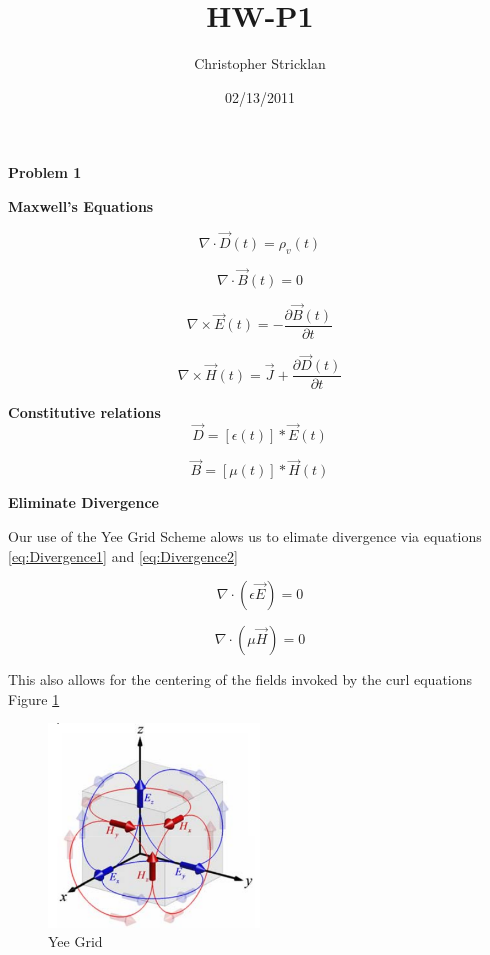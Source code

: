 \documentclass[a4paper,10pt]{article}
\title{HW\pound3-P1}
\author{Christopher Stricklan}
\date{02/13/2011}
\begin{document}
\textbf{Problem 1}


\textbf{Maxwell's Equations}  

\begin{equation}
  \nabla \cdot \vec{D}(t)=\rho_{v}(t)
\end{equation}

\begin{equation}
  \nabla \cdot \vec{B}(t)=0
\end{equation}

\begin{equation}
  \nabla \times \vec{E}(t) = -\frac{\partial \vec{B}(t)}{\partial t}
\end{equation}

\begin{equation}
  \nabla \times \vec{H}(t) = \vec{J} + \frac{\partial\vec{D}(t)}{\partial t}
\end{equation}
                                                                                   

\textbf{Constitutive relations}
\begin{equation}
  \label{eq:constitutive1}
  \vec{D} = [\epsilon(t)]*\vec{E}(t)
\end{equation}

\begin{equation}
  \label{eq:constitutive2}
  \vec{B} = [\mu(t)]*\vec{H}(t)
\end{equation}


\textbf{Eliminate Divergence}

Our use of the Yee Grid Scheme alows us to elimate divergence via equations \eqref{eq:Divergence1} and \eqref{eq:Divergence2}

\begin{equation} 
  \label{eq:Divergence1}
  \nabla \cdot (\epsilon\vec{E}) = 0
\end{equation}

\begin{equation} 
  \label{eq:Divergence2}
  \nabla \cdot(\mu\vec{H}) = 0
\end{equation}

This also allows for the centering of the fields invoked by the curl equations Figure \ref{fig:YeeGridWithCurls}

\begin{figure}[h]
  \centering
    \includegraphics[width=0.5\textwidth]{YeeGrid.png}
  \caption{Yee Grid}
  \label{fig:YeeGridWithCurls}
\end{figure}
	
\end{document}
